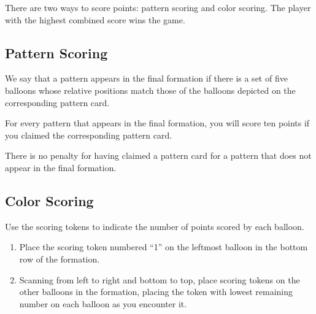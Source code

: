 \documentclass[a6paper, 11pt, parskip=half, DIV=15]{scrartcl}
\begin{document}
There are two ways to score points: pattern scoring and color scoring. The player with the highest combined score wins the game.


\newpage
\enlargethispage{1.75\baselineskip}

\subsection*{Pattern Scoring}
We say that a pattern appears in the final formation if there is a set of five balloons whose relative positions match those of the balloons depicted on the corresponding pattern card. 

For every pattern that appears in the final formation, you will score ten points if you claimed the corresponding pattern card.

There is no penalty for having claimed a pattern card for a pattern that does not appear in the final formation.

\newpage
\enlargethispage{1.75\baselineskip}

\subsection*{Color Scoring}
Use the scoring tokens to indicate the number of points scored by each balloon.
\begin{enumerate}
  \item Place the scoring token numbered ``1'' on the leftmost balloon in the bottom row of the formation.
  \item Scanning from left to right and bottom to top, place scoring tokens on the other balloons in the formation, placing the token with lowest remaining number on each balloon as you encounter it.
\end{enumerate}
\end{document}
